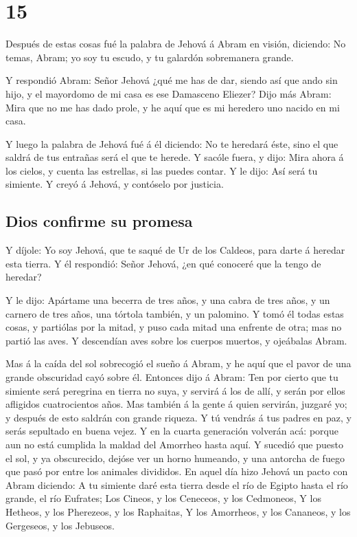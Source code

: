 \hypertarget{section-14}{%
\section{15}\label{section-14}}

 Después de estas cosas fué la palabra de Jehová á Abram en
visión, diciendo: No temas, Abram; yo soy tu escudo, y tu galardón
sobremanera grande.

 Y respondió Abram: Señor Jehová ¿qué me has de dar, siendo
así que ando sin hijo, y el mayordomo de mi casa es ese Damasceno
Eliezer?  Dijo más Abram: Mira que no me has dado prole, y
he aquí que es mi heredero uno nacido en mi casa.

 Y luego la palabra de Jehová fué á él diciendo: No te
heredará éste, sino el que saldrá de tus entrañas será el que te herede.
 Y sacóle fuera, y dijo: Mira ahora á los cielos, y cuenta
las estrellas, si las puedes contar. Y le dijo: Así será tu simiente.
 Y creyó á Jehová, y contóselo por justicia.

\hypertarget{dios-confirme-su-promesa}{%
\subsection{Dios confirme su promesa}\label{dios-confirme-su-promesa}}

 Y díjole: Yo soy Jehová, que te saqué de Ur de los Caldeos,
para darte á heredar esta tierra.  Y él respondió: Señor
Jehová, ¿en qué conoceré que la tengo de heredar?

 Y le dijo: Apártame una becerra de tres años, y una cabra
de tres años, y un carnero de tres años, una tórtola también, y un
palomino.  Y tomó él todas estas cosas, y partiólas por la
mitad, y puso cada mitad una enfrente de otra; mas no partió las aves.
 Y descendían aves sobre los cuerpos muertos, y ojeábalas
Abram.

 Mas á la caída del sol sobrecogió el sueño á Abram, y he
aquí que el pavor de una grande obscuridad cayó sobre él. 
Entonces dijo á Abram: Ten por cierto que tu simiente será peregrina en
tierra no suya, y servirá á los de allí, y serán por ellos afligidos
cuatrocientos años.  Mas también á la gente á quien
servirán, juzgaré yo; y después de esto saldrán con grande riqueza.
 Y tú vendrás á tus padres en paz, y serás sepultado en
buena vejez.  Y en la cuarta generación volverán acá:
porque aun no está cumplida la maldad del Amorrheo hasta aquí.
 Y sucedió que puesto el sol, y ya obscurecido, dejóse ver
un horno humeando, y una antorcha de fuego que pasó por entre los
animales divididos.  En aquel día hizo Jehová un pacto con
Abram diciendo: A tu simiente daré esta tierra desde el río de Egipto
hasta el río grande, el río Eufrates;  Los Cineos, y los
Ceneceos, y los Cedmoneos,  Y los Hetheos, y los Pherezeos,
y los Raphaitas,  Y los Amorrheos, y los Cananeos, y los
Gergeseos, y los Jebuseos.

